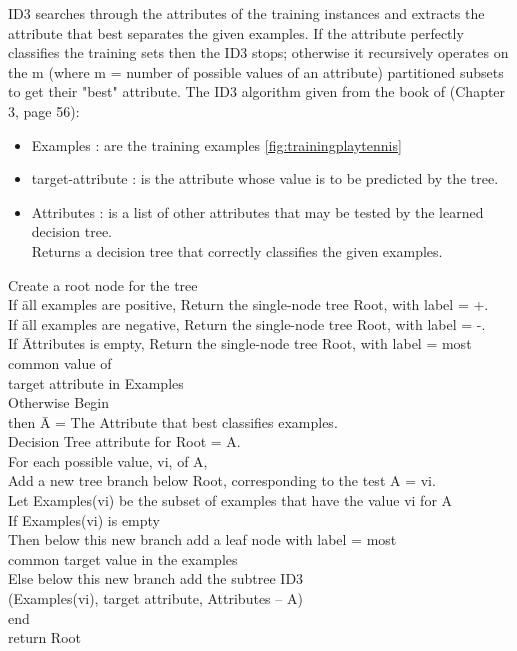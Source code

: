 \documentclass{report}
\begin{document}
ID3 searches through the attributes of the training instances and extracts the attribute that best separates the given examples. If the attribute perfectly classifies the training sets then the ID3 stops; otherwise it recursively operates on the m (where m = number of possible values of an attribute) partitioned subsets to get their "best" attribute.
The ID3 algorithm given from the book of \cite{Mitchell1997MachineLearning}(Chapter 3, page 56):
\begin{itemize}
\item Examples : are the training examples \ref{fig:trainingplaytennis}
\item target-attribute : is the attribute whose value is to be predicted by the tree.
\item Attributes : is a list of other attributes that may be tested by the learned decision tree.\\
Returns a decision tree that correctly classifies the given examples.\\
\end{itemize}


\begin{tabbing}
Create a root node for the tree\\
If \= all examples are positive, Return the single-node tree Root, with label = +.\\
If \= all examples are negative, Return the single-node tree Root, with label = -.\\
If \= Attributes is empty, Return the single-node tree Root, with label = most common value of\\ target attribute in Examples\\
Otherwise Begin \\
\> then \=  A = The Attribute that best classifies examples.\\
\> Decision Tree attribute for Root = A.\\
\> For each possible value, vi, of A,\\
\> \> Add a new tree branch below Root, corresponding to the test A = vi.\\
\> \> Let Examples(vi) be the subset of examples that have the value vi for A\\
\> \> If Examples(vi) is empty\\
\> \> Then below this new branch add a leaf node with label = most\\
\> \> common target value in the examples\\
\> \> Else below this new branch add the subtree ID3 \\
\> \> (Examples(vi), target attribute, Attributes – {A})\\

end\\
return Root\\
\end{tabbing}
\end{document}
